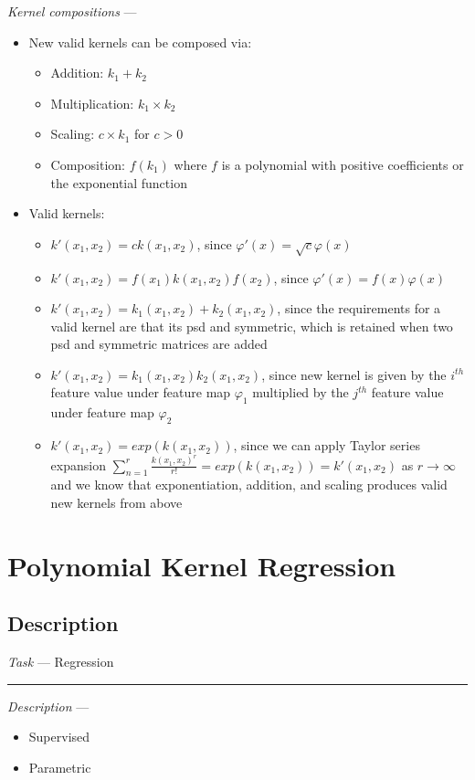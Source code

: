 \emph{Kernel compositions} ---
\begin{itemize}
    \item New valid kernels can be composed via:
    \begin{itemize}
        \item Addition: $k_1 + k_2$
        \item Multiplication: $k_1 \times k_2$
        \item Scaling: $c \times k_1$ for $c > 0$
        \item Composition: $f(k_1)$ where $f$ is a polynomial with positive coefficients or the exponential function
    \end{itemize}
    \item Valid kernels:
    \begin{itemize}
        \item $k'(x_1,x_2) = c k(x_1,x_2)$, since $\varphi'(x) = \sqrt{c}\varphi(x)$
        \item $k'(x_1,x_2) = f(x_1) k(x_1,x_2) f(x_2)$, since $\varphi'(x) = f(x)\varphi(x)$
        \item $k'(x_1,x_2) = k_1(x_1,x_2) + k_2(x_1,x_2)$, since the requirements for a valid kernel are that its psd and symmetric, which is retained when two psd and symmetric matrices are added
        \item $k'(x_1,x_2) = k_1(x_1,x_2) k_2(x_1,x_2)$, since new kernel is given by the $i^{th}$ feature value under feature map $\varphi_1$ multiplied by the $j^{th}$ feature value under feature map $\varphi_2$
        \item $k'(x_1,x_2) = exp(k(x_1,x_2))$, since we can apply Taylor series expansion $\sum_{n=1}^r \frac{k(x_1,x_2)^r}{r!} = exp(k(x_1,x_2)) = k'(x_1,x_2)$ as $r \rightarrow \infty$ and we know that exponentiation, addition, and scaling produces valid new kernels from above
    \end{itemize}
\end{itemize}

\section{Polynomial Kernel Regression}
\subsection*{Description}
\emph{Task} --- Regression

{\color{lightgray}\hrule height 0.001mm}

\emph{Description} --- 
\begin{itemize}
    \item Supervised
    \item Parametric
\end{itemize}

